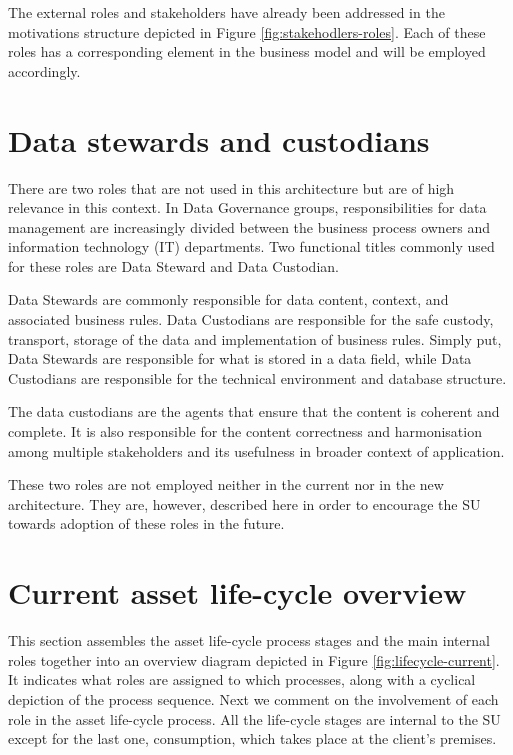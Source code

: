 	The external roles and stakeholders have already been addressed in the motivations structure depicted in Figure \ref{fig:stakehodlers-roles}. Each of these roles has a corresponding element in the business model and will be employed accordingly.

    \section{Data stewards and custodians}
    There are two roles that are not used in this architecture but are of high relevance in this context. In Data Governance groups, responsibilities for data management are increasingly divided between the business process owners and information technology (IT) departments. Two functional titles commonly used for these roles are Data Steward and Data Custodian.
     
     Data Stewards are commonly responsible for data content, context, and associated business rules. Data Custodians are responsible for the safe custody, transport, storage of the data and implementation of business rules. Simply put, Data Stewards are responsible for what is stored in a data field, while Data Custodians are responsible for the technical environment and database structure.
     
     The data custodians are the agents that ensure that the content is coherent and complete. It is also responsible for the content correctness and harmonisation among multiple stakeholders and its usefulness in broader context of application.	
     
     These two roles are not employed neither in the current nor in the new architecture. They are, however, described here in order to encourage the SU towards adoption of these roles in the future. 

	\section{Current asset life-cycle overview}
	\label{sec:lifecycle-current}
	
	This section assembles the asset life-cycle process stages and the main internal roles together into an overview diagram depicted in Figure \ref{fig:lifecycle-current}. It indicates what roles are assigned to which processes, along with a cyclical depiction of the process sequence. Next we comment on the involvement of each role in the asset life-cycle process. All the life-cycle stages are internal to the SU except for the last one, consumption, which takes place at the client's premises.
	
